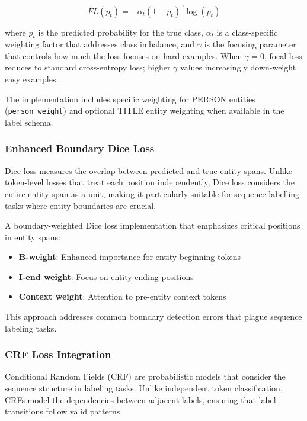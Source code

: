 \documentclass[a4paper]{usiinfbachelorproject}
\begin{document}
\begin{equation}
    FL(p_t) = -\alpha_t(1-p_t)^\gamma \log(p_t)
\end{equation}

where $p_t$ is the predicted probability for the true class, $\alpha_t$ is a class-specific weighting factor that addresses class imbalance, and $\gamma$ is the focusing parameter that controls how much the loss focuses on hard examples. When $\gamma = 0$, focal loss reduces to standard cross-entropy loss; higher $\gamma$ values increasingly down-weight easy examples.

The implementation includes specific weighting for PERSON entities (\texttt{person\_weight}) and optional TITLE entity weighting when available in the label schema.

\subsubsection{Enhanced Boundary Dice Loss}

Dice loss measures the overlap between predicted and true entity spans.\cite{Li2019DiceLF} Unlike token-level losses that treat each position independently, Dice loss considers the entire entity span as a unit, making it particularly suitable for sequence labelling tasks where entity boundaries are crucial.

A boundary-weighted Dice loss implementation that emphasizes critical positions in entity spans:

\begin{itemize}
    \item \textbf{B-weight}: Enhanced importance for entity beginning tokens
    \item \textbf{I-end weight}: Focus on entity ending positions
    \item \textbf{Context weight}: Attention to pre-entity context tokens
\end{itemize}

This approach addresses common boundary detection errors that plague sequence labeling tasks.

\subsubsection{CRF Loss Integration}

Conditional Random Fields (CRF) are probabilistic models that consider the sequence structure in labeling tasks. Unlike independent token classification, CRFs model the dependencies between adjacent labels, ensuring that label transitions follow valid patterns.
\end{document}
